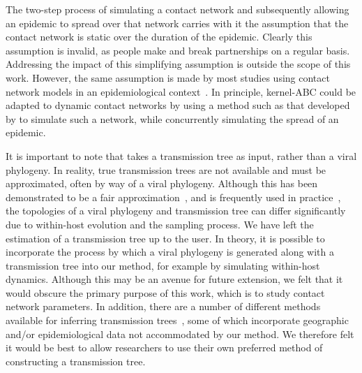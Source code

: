 
The two-step process of simulating a contact network and subsequently allowing
an epidemic to spread over that network carries with it the assumption that the
contact network is static over the duration of the epidemic. Clearly this
assumption is invalid, as people make and break partnerships on a regular
basis. Addressing the impact of this simplifying assumption is outside the
scope of this work. However, the same assumption is made by most studies using
contact network models in an epidemiological
context~\autocite{welch2011statistical, bansal2007individual}. In principle,
kernel-\gls{ABC} could be adapted to dynamic contact networks by using a method
such as that developed by \textcite{robinson2012dynamics} to simulate such a
network, while concurrently simulating the spread of an epidemic.

It is important to note that  takes a transmission tree as
input, rather than a viral phylogeny. In reality, true transmission trees are
not available and must be approximated, often by way of a viral phylogeny.
Although this has been demonstrated to be a fair
approximation~\autocite[e.g.][]{leitner1996accurate}, and is frequently used in
practice~\autocite[e.g.][]{stadler2013uncovering}, the topologies of a viral
phylogeny and transmission tree can differ
significantly~\autocite{ypma2013relating} due to within-host evolution and the
sampling process. We have left the estimation of a transmission tree up to the
user. In theory, it is possible to incorporate the process by which a viral
phylogeny is generated along with a transmission tree into our method, for
example by simulating within-host dynamics. Although this may be an avenue for
future extension, we felt that it would obscure the primary purpose of this
work, which is to study contact network parameters. In addition, there are a
number of different methods available for inferring transmission
trees~\autocite{didelot2014bayesian, ypma2012unravelling,
jombart2011reconstructing, cottam2008integrating}, some of which incorporate
geographic and/or epidemiological data not accommodated by our method. We
therefore felt it would be best to allow researchers to use their own preferred
method of constructing a transmission tree.


